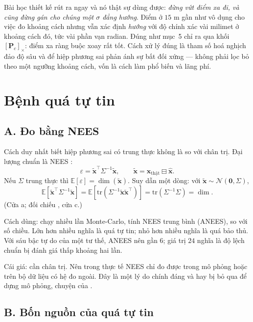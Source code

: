 \documentclass[../../vslam.tex]{subfiles}
\begin{document}
Bài học thiết kế rút ra ngay và nó thật sự dùng được: \emph{đừng vứt điểm xa đi, và cũng đừng gán cho chúng một \(\sigma\) đẳng hướng}. Điểm ở \(15\) m gần như vô dụng cho việc đo khoảng cách nhưng vẫn xác định \emph{hướng} với độ chính xác vài milimet ở khoảng cách đó, tức vài phần vạn radian. Đúng như  mục~5 chỉ ra qua khối \([\mathbf{P}_c]_\times\): điểm xa ràng buộc xoay rất tốt. Cách xử lý đúng là tham số hoá nghịch đảo độ sâu và để hiệp phương sai phản ánh sự bất đối xứng --- không phải lọc bỏ theo một ngưỡng khoảng cách, vốn là cách làm phổ biến và lãng phí.

\section{Bệnh quá tự tin}

\subsection{A. Đo bằng NEES}

Cách duy nhất biết hiệp phương sai có trung thực không là so với chân trị. Đại lượng chuẩn là NEES \cite{barshalom2001}:
\[
\varepsilon = \tilde{\mathbf{x}}^{\top}\Sigma^{-1}\tilde{\mathbf{x}},
\qquad \tilde{\mathbf{x}} = \mathbf{x}_{\text{thật}} \boxminus \hat{\mathbf{x}} .
\]
Nếu \(\Sigma\) trung thực thì \(\mathbb{E}[\varepsilon] = \dim(\tilde{\mathbf{x}})\). Suy dẫn một dòng: với \(\tilde{\mathbf{x}} \sim \mathcal{N}(\mathbf{0},\Sigma)\),
\[
\mathbb{E}[\tilde{\mathbf{x}}^\top\Sigma^{-1}\tilde{\mathbf{x}}] = \mathbb{E}[\mathrm{tr}(\Sigma^{-1}\tilde{\mathbf{x}}\tilde{\mathbf{x}}^\top)] = \mathrm{tr}(\Sigma^{-1}\Sigma) = \dim .
\]
(Cửa a; đối chiếu \cite{barshalom2001}, cửa c.)

Cách dùng: chạy nhiều lần Monte-Carlo, tính NEES trung bình (ANEES), so với số chiều. Lớn hơn nhiều nghĩa là quá tự tin; nhỏ hơn nhiều nghĩa là quá bảo thủ. Với sáu bậc tự do của một tư thế, ANEES nên gần \(6\); giá trị \(24\) nghĩa là độ lệch chuẩn bị đánh giá thấp khoảng hai lần.

Cái giá: cần chân trị. Nên trong thực tế NEES chỉ đo được trong mô phỏng hoặc trên bộ dữ liệu có hệ đo ngoài. Đây là một lý do chính đáng và hay bị bỏ qua để dựng mô phỏng, chuyện của .

\subsection{B. Bốn nguồn của quá tự tin}
\end{document}
